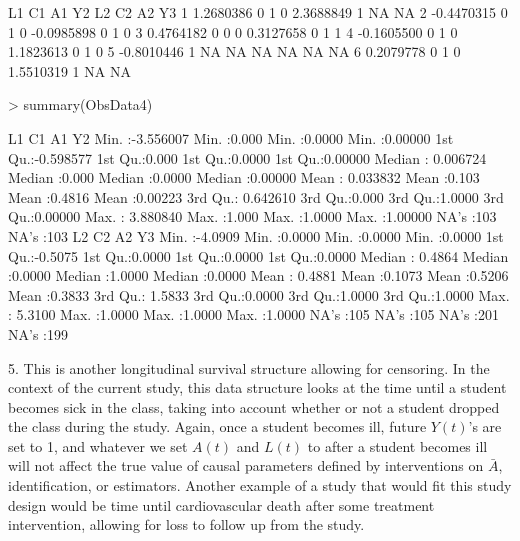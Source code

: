\documentclass{exam}
\begin{document}
\begin{solution}
\begin{Schunk}
\end{Schunk}

\begin{Schunk}
\begin{Soutput}
          L1 C1 A1 Y2         L2 C2 A2 Y3
1  1.2680386  0  1  0  2.3688849  1 NA NA
2 -0.4470315  0  1  0 -0.0985898  0  1  0
3  0.4764182  0  0  0  0.3127658  0  1  1
4 -0.1605500  0  1  0  1.1823613  0  1  0
5 -0.8010446  1 NA NA         NA NA NA NA
6  0.2079778  0  1  0  1.5510319  1 NA NA
\end{Soutput}
\begin{Sinput}
> summary(ObsData4)
\end{Sinput}
\begin{Soutput}
       L1                  C1              A1               Y2         
 Min.   :-3.556007   Min.   :0.000   Min.   :0.0000   Min.   :0.00000  
 1st Qu.:-0.598577   1st Qu.:0.000   1st Qu.:0.0000   1st Qu.:0.00000  
 Median : 0.006724   Median :0.000   Median :0.0000   Median :0.00000  
 Mean   : 0.033832   Mean   :0.103   Mean   :0.4816   Mean   :0.00223  
 3rd Qu.: 0.642610   3rd Qu.:0.000   3rd Qu.:1.0000   3rd Qu.:0.00000  
 Max.   : 3.880840   Max.   :1.000   Max.   :1.0000   Max.   :1.00000  
                                     NA's   :103      NA's   :103      
       L2                C2               A2               Y3        
 Min.   :-4.0909   Min.   :0.0000   Min.   :0.0000   Min.   :0.0000  
 1st Qu.:-0.5075   1st Qu.:0.0000   1st Qu.:0.0000   1st Qu.:0.0000  
 Median : 0.4864   Median :0.0000   Median :1.0000   Median :0.0000  
 Mean   : 0.4881   Mean   :0.1073   Mean   :0.5206   Mean   :0.3833  
 3rd Qu.: 1.5833   3rd Qu.:0.0000   3rd Qu.:1.0000   3rd Qu.:1.0000  
 Max.   : 5.3100   Max.   :1.0000   Max.   :1.0000   Max.   :1.0000  
 NA's   :105       NA's   :105      NA's   :201      NA's   :199     
\end{Soutput}
\end{Schunk}

5. This is another longitudinal survival structure allowing for censoring. In the context of the current study, this data structure looks at the time until a student becomes sick in the class, taking into account whether or not a student dropped the class during the study. Again, once a student becomes ill, future $Y(t)$'s are set to 1, and whatever we set $A(t)$ and $L(t)$ to after a student becomes ill will not affect the true value of causal parameters defined by interventions on $\bar{A}$, identification, or estimators. Another example of a study that would fit this study design would be time until cardiovascular death after some treatment intervention, allowing for loss to follow up from the study.


\end{solution}
\end{document}
